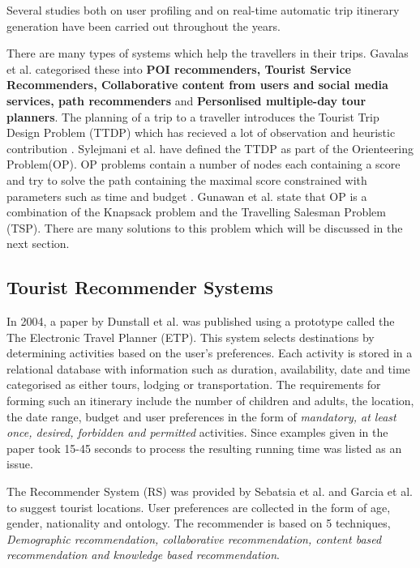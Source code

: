 Several studies both on user profiling and on real-time automatic trip
itinerary generation have been carried out throughout the years. 

There are many types of systems which help the travellers in their
trips. Gavalas et al. \cite{Gavalas2014} categorised these into
\textbf{POI recommenders, Tourist Service Recommenders, Collaborative
content from users and social media services, path recommenders} and
\textbf{Personlised multiple-day tour planners}. The planning of a
trip to a traveller introduces the Tourist Trip Design Problem (TTDP)
which has recieved a lot of observation and heuristic contribution
\cite{Gunawan2016,Delic2018}. Sylejmani et al.\cite{Sylejmani2017}
have defined the TTDP as part of the Orienteering Problem(OP). OP
problems contain a number of nodes each containing a score and try to
solve the path containing the maximal score constrained with
parameters such as time and budget \cite{Gunawan2016}. Gunawan et al.
\cite{Gunawan2016} state that OP is a combination of the Knapsack
problem and the Travelling Salesman Problem (TSP). There are many
solutions to this problem which will be discussed in the next section.

\subsection{Tourist Recommender Systems}

    In 2004, a paper by Dunstall et al. \cite{DUNSTALL2008a} was
    published using a prototype called the The Electronic Travel
    Planner (ETP). This system selects destinations by determining
    activities based on the user’s preferences. Each activity is
    stored in a relational database with information such as duration,
    availability, date and time categorised as either tours, lodging
    or transportation. The requirements for forming such an itinerary
    include the number of children and adults, the location, the date
    range, budget and user preferences in the form of \emph{mandatory,
    at least once, desired, forbidden and permitted} activities. Since
    examples given in the paper took 15-45 seconds to process the
    resulting running time was listed as an issue.

    The Recommender System (RS) was provided by Sebatsia et al.
    \cite{Sebastia2009a} and Garcia et al. \cite{Garcia2011} to
    suggest tourist locations. User preferences are collected in the
    form of age, gender, nationality and ontology. The recommender is
    based on 5 techniques, \emph{Demographic recommendation,
    collaborative recommendation, content based recommendation and
    knowledge based recommendation}. 

